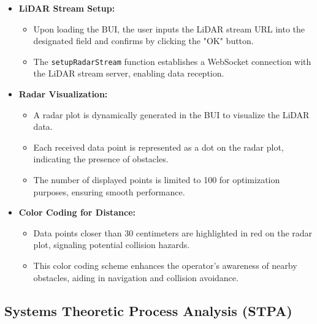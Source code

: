 \documentclass{article}
\begin{document}
    \begin{itemize}
        \item \textbf{LiDAR Stream Setup:}
            \begin{itemize}
                \item Upon loading the BUI, the user inputs the LiDAR stream URL into the designated field and confirms by clicking the "OK" button.
                \item The \texttt{setupRadarStream} function establishes a WebSocket connection with the LiDAR stream server, enabling data reception.
            \end{itemize}
        
        \item \textbf{Radar Visualization:}
            \begin{itemize}
                \item A radar plot is dynamically generated in the BUI to visualize the LiDAR data.
                \item Each received data point is represented as a dot on the radar plot, indicating the presence of obstacles.
                \item The number of displayed points is limited to 100 for optimization purposes, ensuring smooth performance.
            \end{itemize}
        
        \item \textbf{Color Coding for Distance:}
            \begin{itemize}
                \item Data points closer than 30 centimeters are highlighted in red on the radar plot, signaling potential collision hazards.
                \item This color coding scheme enhances the operator's awareness of nearby obstacles, aiding in navigation and collision avoidance.
            \end{itemize}
    \end{itemize}
\newpage

\subsection{Systems Theoretic Process Analysis (STPA)}
\end{document}
